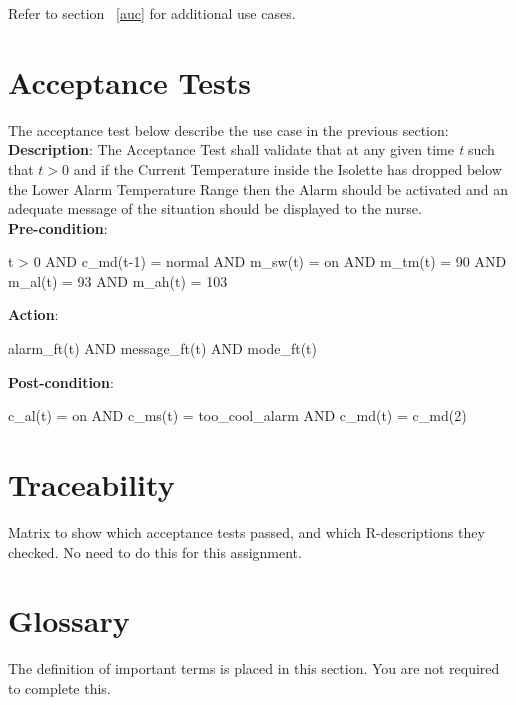 \documentclass[fontsize=12pt,paper=letter,twoside]{scrartcl}
\begin{document}
\smallskip
\noindent Refer to section ~\ref{auc} for additional use cases.


\newpage
\section{Acceptance Tests}

The acceptance test below describe the use case in the previous section:\\

\smallskip
\noindent \textbf{Description}: The Acceptance Test shall validate that at any given time \emph{t} such that $t > 0$ and if the Current Temperature inside the Isolette has dropped below the Lower Alarm Temperature Range then the Alarm should be activated and an adequate message of the situation should be displayed to the nurse.\\

\smallskip
\noindent \textbf{Pre-condition}: 
\begin{pvs}
	t > 0
	AND c_md(t-1) = normal 
	AND m_sw(t) = on 
	AND m_tm(t) = 90
	AND m_al(t) = 93 
	AND m_ah(t) = 103 
\end{pvs}

\smallskip
\noindent \textbf{Action}: 
\begin{pvs}
	alarm_ft(t)
	AND message_ft(t) 
	AND mode_ft(t) 
\end{pvs}

\smallskip
\noindent \textbf{Post-condition}: 
\begin{pvs}
	c_al(t) = on 
	AND c_ms(t) = too_cool_alarm 
	AND c_md(t) = c_md(2)  
\end{pvs}

\newpage
\section{Traceability}

Matrix to show which acceptance tests passed, and which R-descriptions they checked. No need to do this for this assignment. 


\section{Glossary}

The definition of important terms is placed in this section. You are not required to complete this.


\end{document}
